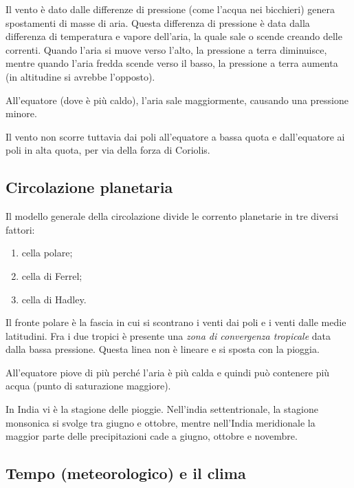 \documentclass[a4paper]{article}
\begin{document}
Il vento è dato dalle differenze di pressione (come l'acqua nei bicchieri)
genera spostamenti di masse di aria.
Questa differenza di pressione è data dalla differenza di temperatura e vapore dell'aria,
la quale sale o scende creando delle correnti.
Quando l'aria si muove verso l'alto, la pressione a terra diminuisce,
mentre quando l'aria fredda scende verso il basso, la pressione a terra aumenta
(in altitudine si avrebbe l'opposto).

All'equatore (dove è più caldo), l'aria sale maggiormente, causando una pressione minore.

Il vento non scorre tuttavia dai poli all'equatore a bassa quota e dall'equatore ai poli in alta quota,
per via della forza di Coriolis.

\subsection{Circolazione planetaria}

Il modello generale della circolazione divide le corrento planetarie in tre diversi fattori:
\begin{enumerate}
    \item cella polare;
    \item cella di Ferrel;
    \item cella di Hadley.
\end{enumerate}

Il fronte polare è la fascia in cui si scontrano i venti dai poli e i venti dalle medie latitudini.
Fra i due tropici è presente una \textit{zona di convergenza tropicale} data dalla bassa pressione.
Questa linea non è lineare e si sposta con la pioggia.

All'equatore piove di più perché l'aria è più calda e quindi può contenere più acqua (punto di saturazione maggiore). 

In India vi è la stagione delle pioggie. Nell'india settentrionale,
la stagione monsonica si svolge tra giugno e
ottobre, mentre nell'India meridionale la maggior parte
delle precipitazioni cade a giugno, ottobre e novembre.

\subsection{Tempo (meteorologico) e il clima}

\end{document}
